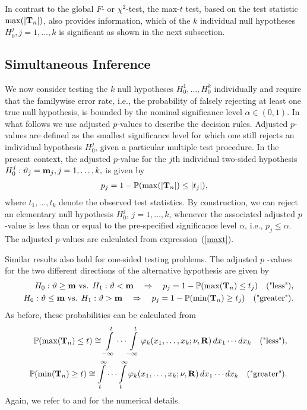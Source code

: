 \documentclass[12pt,a4paper]{article}
\begin{document}
In contrast to the global $F$- or $\chi^2$-test, the max-$t$ test,
based on the test statistic $\max(|\mathbf{T}_n|)$, also provides information, 
which of the $k$ individual null hypotheses $%
H_0^j, j = 1, \dots, k$ is significant as shown in the next subsection.

\subsection{Simultaneous Inference}

\label{simtest} %

We now consider testing the $k$ null hypotheses $H_0^1, \ldots, H_0^k$
individually and require that the familywise error rate, i.e., the
probability of falsely rejecting at least one true null hypothesis, is
bounded by the nominal significance level $\alpha \in (0, 1)$. In what
follows we use adjusted $p$-values to describe the decision rules. Adjusted $%
p$-values are defined as the smallest significance level for which one still
rejects an individual hypothesis $H_0^j$, given a particular multiple test
procedure. In the present context, the adjusted $p$-value for the $j$th
individual two-sided hypothesis $H_0^j: \vartheta_j = \mathbf{m}_j, j = 1,
\dots, k, $ is given by 
\begin{eqnarray*}
p_j = 1 - \mathbb{P}(\max(|\mathbf{T}_n|) \le |t_j|),
\end{eqnarray*}
where $t_1, \dots, t_k$ denote the observed test statistics. By
construction, we can reject an elementary null hypothesis $H_0^j$, $j= 1,
\ldots, k$, whenever the associated adjusted $p$-value is less than or equal
to the pre-specified significance level $\alpha$, i.e., $p_j \leq \alpha$.
The adjusted $p$-values are calculated from expression~(\ref{maxt}).

Similar results also hold for one-sided testing problems. The adjusted $p$%
-values for the two different directions of the alternative hypothesis are
given by 
\begin{eqnarray*}
& & H_0: \vartheta \ge \mathbf{m} \text{ vs. } H_1: \vartheta < \mathbf{m} \quad
\Rightarrow \quad p_j = 1 - \mathbb{P}(\max(\mathbf{T}_n) \le t_j) \quad \text{("less")}, \\
& & H_0: \vartheta \le \mathbf{m} \text{ vs. } H_1: \vartheta > \mathbf{m} \quad
\Rightarrow \quad p_j = 1 - \mathbb{P}(\min(\mathbf{T}_n) \ge t_j) \quad \text{("greater")}.
\end{eqnarray*}
As before, these probabilities can be calculated from 
\begin{eqnarray*}
& & \mathbb{P}(\max(\mathbf{T}_n) \le t) \cong\int\limits_{-\infty}^t \cdots
\int\limits_{-\infty}^t \varphi_k(x_1, \dots, x_k; \nu, \mathbf{R}) \, dx_1 \cdots
dx_k \quad \text{("less")}, \\
& & \mathbb{P}(\min(\mathbf{T}_n) \ge t) \cong \int\limits_{t}^\infty \cdots
\int\limits_{t}^\infty \varphi_k(x_1, \dots, x_k; \nu, \mathbf{R}) \, dx_1 \cdots
dx_k \quad \text{("greater")}.
\end{eqnarray*}
Again, we refer to \cite{Genz1992,GenzBretz1999,BretzGenzHothorn2001} and 
\cite{GenzBretz2002} for the numerical details.
\end{document}
